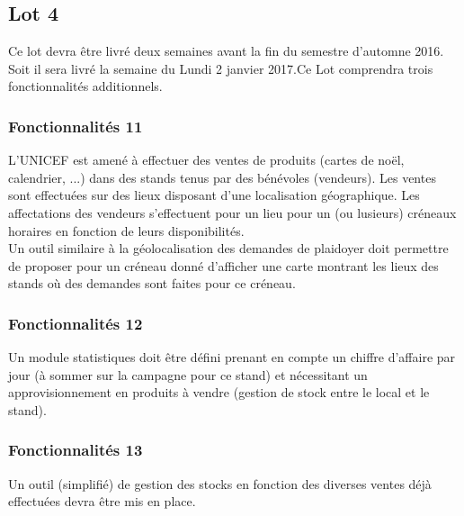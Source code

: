 \subsection{Lot 4}
Ce lot devra être livré deux semaines avant la fin du semestre d'automne 2016.  Soit il sera livré la semaine du Lundi 2 janvier 2017.Ce Lot comprendra trois fonctionnalités additionnels.
\\

\subsubsection{Fonctionnalités 11}
L'UNICEF est amené à effectuer des ventes de produits (cartes de noël, calendrier, ...) dans des stands tenus par des bénévoles (vendeurs). Les ventes sont effectuées sur des lieux disposant d'une localisation géographique. Les affectations des vendeurs s'effectuent pour un lieu pour un (ou lusieurs) créneaux horaires en fonction de leurs disponibilités.
\\
Un outil similaire à la géolocalisation des demandes de plaidoyer doit permettre de proposer pour un créneau donné d'afficher une carte montrant les lieux des stands où des demandes sont faites pour ce créneau.
\\

\subsubsection{Fonctionnalités 12}
Un module statistiques doit être défini prenant en compte un chiffre d'affaire par jour (à sommer sur la campagne pour ce stand) et nécessitant un approvisionnement en produits à vendre (gestion de stock entre le local et le stand).
\\

\subsubsection{Fonctionnalités 13}
Un outil (simplifié) de gestion des stocks en fonction des diverses ventes déjà effectuées devra être mis en place.
\\
